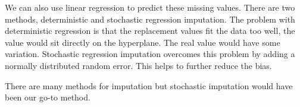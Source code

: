 \documentclass[12pt]{article}
\begin{document}
\par We can also use linear regression to predict these missing values. There are two methods, deterministic and stochastic regression imputation. The problem with deterministic regression is that the replacement values fit the data too well, the value would sit directly on the hyperplane. The real value would have some variation. Stochastic regression imputation overcomes this problem by adding a normally distributed random error. This helps to further reduce the bias.\cite{Columbia}

\par There are many methods for imputation but stochastic imputation would have been our go-to method.


\printbibliography[title={References}]
\end{document}
